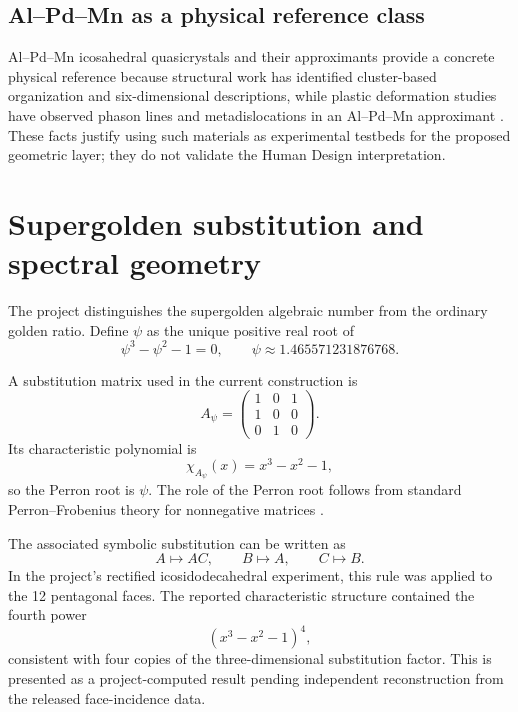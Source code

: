 \documentclass[11pt,a4paper]{article}
\numberwithin{equation}{section}
\begin{document}
\subsection{Al--Pd--Mn as a physical reference class}

Al--Pd--Mn icosahedral quasicrystals and their approximants provide a concrete physical reference because structural work has identified cluster-based organization and six-dimensional descriptions, while plastic deformation studies have observed phason lines and metadislocations in an Al--Pd--Mn approximant \citep{Ebert1996,Klein1999}. These facts justify using such materials as experimental testbeds for the proposed geometric layer; they do not validate the Human Design interpretation.

\section{Supergolden substitution and spectral geometry}
\label{sec:supergolden}

The project distinguishes the supergolden algebraic number from the ordinary golden ratio. Define $\psi$ as the unique positive real root of
\begin{equation}
\psi^3-\psi^2-1=0,
\qquad
\psi\approx1.465571231876768.
\label{eq:psi}
\end{equation}

A substitution matrix used in the current construction is
\begin{equation}
A_{\psi}=
\begin{pmatrix}
1&0&1\\
1&0&0\\
0&1&0
\end{pmatrix}.
\label{eq:supergolden-matrix}
\end{equation}
Its characteristic polynomial is
\begin{equation}
\chi_{A_{\psi}}(x)=x^3-x^2-1,
\end{equation}
so the Perron root is $\psi$. The role of the Perron root follows from standard Perron--Frobenius theory for nonnegative matrices \citep{HornJohnson2013}.

The associated symbolic substitution can be written as
\[
A\mapsto AC,
\qquad
B\mapsto A,
\qquad
C\mapsto B.
\]
In the project's rectified icosidodecahedral experiment, this rule was applied to the 12 pentagonal faces. The reported characteristic structure contained the fourth power
\[
(x^3-x^2-1)^4,
\]
consistent with four copies of the three-dimensional substitution factor. This is presented as a project-computed result pending independent reconstruction from the released face-incidence data.
\end{document}
